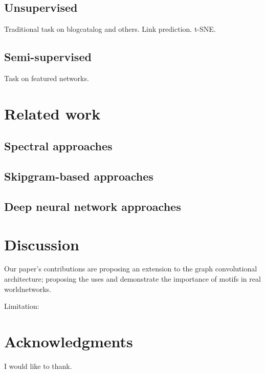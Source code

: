 \documentclass{article}
\theoremstyle{definition}
\begin{document}
\subsection{Unsupervised}

Traditional task on blogcatalog and others.
Link prediction.
t-SNE.

\subsection{Semi-supervised}

Task on featured networks.

\section{Related work}

\subsection{Spectral approaches}

\subsection{Skipgram-based approaches }

\subsection{Deep neural network approaches}

\section{Discussion}

Our paper's contributions are proposing an extension to the graph convolutional 
architecture; proposing the uses and demonstrate the importance of motifs in
real worldnetworks.

Limitation: 


\section*{Acknowledgments}

I would like to thank.



\end{document}
